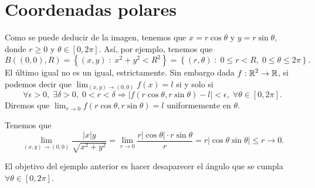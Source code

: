\section{Coordenadas polares}
Como se puede deducir de la imagen, tenemos que $\displaystyle x = r\cos\theta $ y $\displaystyle y = r\sin \theta $, donde $\displaystyle r \geq 0 $ y $\displaystyle \theta \in [0,2\pi] $. Así, por ejemplo, tenemos que 
\[ B\left(\left(0,0\right), R\right) = \left\{ \left(x,y\right) \; : \; x^{2} +y^{2}<R^{2}\right\} = \left\{ \left(r, \theta \right) \; : \; 0 \leq r < R, \; 0 \leq \theta \leq 2\pi \right\}  .\]
El último igual no es un igual, estrictamente. Sin embargo dada $\displaystyle f: \mathbb{R}^{2} \to \mathbb{R} $, si podemos decir que $\displaystyle \lim_{\left(x,y\right) \to \left(0,0\right)}f\left(x\right) = l $ si y solo si 
\[\forall \epsilon > 0, \; \exists \delta > 0, \; 0 < r < \delta \Rightarrow \left|f\left(r \cos \theta, r \sin \theta\right)-l\right| < \epsilon, \; \forall \theta \in [0,2\pi].\]
Diremos que $\displaystyle \lim_{r \to 0}f\left(r \cos \theta, r \sin \theta\right)= l $ uniformemente en $\displaystyle \theta  $. 
\begin{eg}
Tenemos que
\[\lim_{\left(x,y\right) \to \left(0,0\right)}\frac{ \left|x\right|y}{\sqrt{x^{2}+y^{2}}}  = \lim_{r \to 0} \frac{r \left|\cos \theta\right| \cdot r \sin\theta}{r} = r \left|\cos\theta \sin \theta\right|\leq r \to 0 .\]
\end{eg}
\begin{observation}
	El objetivo del ejemplo anterior es hacer desaparecer el ángulo que se cumpla $\displaystyle \forall \theta \in [0,2\pi] $. 
\end{observation}

